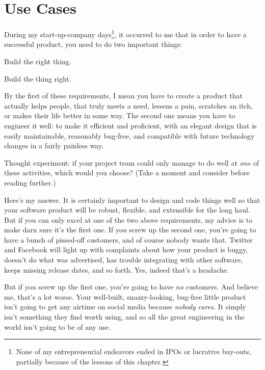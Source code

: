 
\chapter{Use Cases}

During my start-up-company days\footnote{None of my entrepreneurial endeavors
ended in IPOs or lucrative buy-outs, partially because of the lessons of this
chapter.}, it occurred to me that in order to have a successful product, you
need to do two important things:

\begin{compactenum}
\item Build the right thing.
\item Build the thing right.
\end{compactenum}

By the first of these requirements, I mean you have to create a product that
actually helps people, that truly meets a need, lessens a pain, scratches an
itch, or makes their life better in some way. The second one means you have to
engineer it well: to make it efficient and proficient, with an elegant design
that is easily maintainable, reasonably bug-free, and compatible with future
technology changes in a fairly painless way.

Thought experiment: if your project team could only manage to do well at
\textit{one} of these activities, which would you choose? (Take a moment and
consider before reading further.)

Here's my answer. It is certainly important to design and code things well so
that your software product will be robust, flexible, and extensible for the
long haul. But if you can only excel at one of the two above requirements, my
advice is to make darn sure it's the first one. If you screw up the second
one, you're going to have a bunch of pissed-off customers, and of course
nobody wants that. Twitter and Facebook will light up with complaints about
how your product is buggy, doesn't do what was advertised, has trouble
integrating with other software, keeps missing release dates, and so forth.
Yes, indeed that's a headache.

But if you screw up the first one, you're going to have \textit{no} customers.
And believe me, that's a lot worse. Your well-built, snazzy-looking, bug-free
little product isn't going to get any airtime on social media because
\textit{nobody cares}. It simply isn't something they find worth using, and so
all the great engineering in the world isn't going to be of any use.

